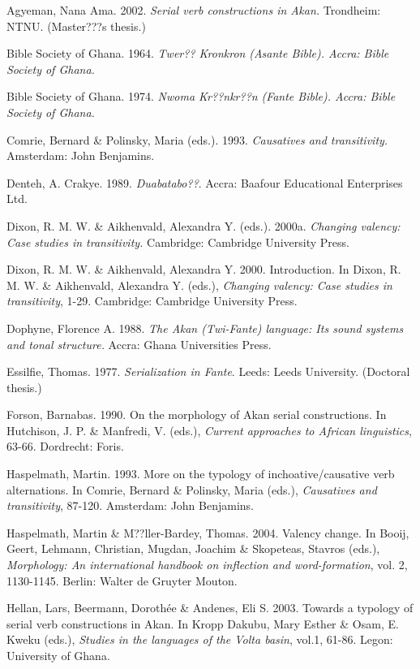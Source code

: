 \documentclass[output=paper]{langsci/langscibook}
\begin{document}
Agyeman, Nana Ama. 2002. \emph{Serial verb constructions in Akan.} Trondheim: NTNU. (Master???s thesis.)

Bible Society of Ghana. 1964. \emph{Twer?? Kronkron}\emph{\textup{ (}}\emph{Asante Bible}\emph{\textup{). Accra: Bible Society of Ghana.}}

Bible Society of Ghana. 1974. \emph{Nwoma Kr??nkr??n}\emph{\textup{ (}}\emph{Fante Bible}\emph{\textup{). Accra: Bible Society of Ghana.}}

Comrie, Bernard \& Polinsky, Maria (eds.). 1993. \textit{Causatives and transitivity.} Amsterdam: John Benjamins.

Denteh, A. Crakye. 1989. \emph{Duabatabo??}. Accra: Baafour Educational Enterprises Ltd.

Dixon, R. M. W. \& Aikhenvald, Alexandra Y. (eds.). 2000a. \textit{Changing valency: Case studies in transitivity.} Cambridge: Cambridge University Press.

Dixon, R. M. W. \& Aikhenvald, Alexandra Y. 2000. Introduction. In Dixon, R. M. W. \& Aikhenvald, Alexandra Y. (eds.), \textit{Changing valency: Case studies in transitivity}, 1-29. Cambridge: Cambridge University Press.

Dophyne, Florence A. 1988. \textit{The Akan (Twi-Fante) language: Its sound systems and tonal structure.} Accra: Ghana Universities Press.

Essilfie, Thomas. 1977. \textit{Serialization in Fante}. Leeds: Leeds University. (Doctoral thesis.)

Forson, Barnabas. 1990. On the morphology of Akan serial constructions. In Hutchison, J. P. \& Manfredi, V. (eds.), \textit{Current approaches to African linguistics}, 63-66. Dordrecht: Foris.

Haspelmath, Martin. 1993. More on the typology of inchoative/causative verb alternations. In Comrie, Bernard \& Polinsky, Maria (eds.), \textit{Causatives and transitivity}, 87-120. Amsterdam: John Benjamins.

Haspelmath, Martin \& M??ller-Bardey, Thomas. 2004. Valency change. In Booij, Geert, Lehmann, Christian, Mugdan, Joachim \& Skopeteas, Stavros (eds.), \textit{Morphology: An international handbook on inflection and word-formation}, vol. 2, 1130-1145. Berlin: Walter de Gruyter Mouton.

Hellan, Lars, Beermann, Dorothée \& Andenes, Eli S. 2003. Towards a typology of serial verb constructions in Akan. In Kropp Dakubu, Mary Esther \& Osam, E. Kweku (eds.), \textit{Studies in the languages of the Volta basin}, vol.1, 61-86. Legon: University of Ghana.
\end{document}
